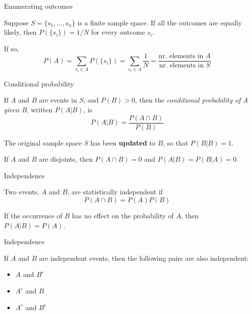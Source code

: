 \documentclass{beamer}
\begin{document}
\begin{frame}{Enumerating outcomes}

	Suppose $S=\{s_1,...,s_n\}$ is a finite sample space. If all the outcomes are equally likely, then $P(\{s_i\})=1/N$ for every outcome $s_i$. 

	If so,
	\begin{equation*}
		P(A) = \sum_{s_i \in A} P(\{s_i\}) = \sum_{s_i \in A} \frac{1}{N} = \frac{\text{nr. elements in } A}{\text{nr. elements in } S}
	\end{equation*}


\end{frame}

\begin{frame}{Conditional probability}

	\begin{block}{}
		If $A$ and $B$ are events in $S$, and $P(B)>0$, then the \textit{conditional probability of A given B}, 
		written $P(A|B)$, is
		\begin{equation*}
			P(A|B) = \frac{P(A \cap B)}{P(B)}
		\end{equation*}
	\end{block}

	\pause
	The original sample space $S$ has been \textbf{updated} to $B$, so that $P(B|B)=1$.

	If $A$ and $B$ are disjoints, then $P(A \cap B)=0$ and $P(A|B)=P(B|A)=0$.

\end{frame}

\begin{frame}{Independence}

	\begin{block}{}
		Two events, $A$ and $B$, are statistically independent if
		\begin{equation*}
			P(A \cap B) = P(A)P(B)
		\end{equation*}
	\end{block}

	If the occurrence of $B$ has no effect on the probability of $A$, then $P(A|B)=P(A)$.

\end{frame}

\begin{frame}{Independence}

	If $A$ and $B$ are independent events, then the following pairs are also independent:
	\begin{itemize}
		\item $A$ and $B^c$
		\item $A^c$ and $B$
		\item $A^c$ and $B^c$
	\end{itemize}

\end{frame}
\end{document}
